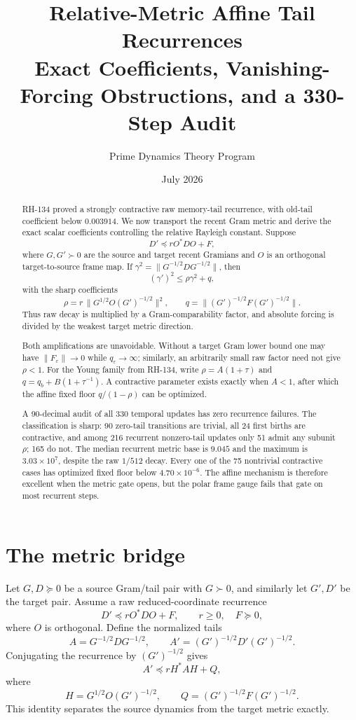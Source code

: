 \documentclass[12pt]{article}
\title{Relative-Metric Affine Tail Recurrences\\\large Exact Coefficients, Vanishing-Forcing Obstructions, and a 330-Step Audit}
\author{Prime Dynamics Theory Program}
\date{July 2026}
\begin{document}
\maketitle

\begin{abstract}
RH-134 proved a strongly contractive raw memory-tail recurrence, with old-tail
coefficient below $0.003914$.  We now transport the recent Gram metric and
derive the exact scalar coefficients controlling the relative Rayleigh
constant.  Suppose
\[
 D'\preceq rO^*DO+F,
\]
where $G,G'\succ0$ are the source and target recent Gramians and $O$ is an
orthogonal target-to-source frame map.  If
$\gamma^2=\|G^{-1/2}DG^{-1/2}\|$, then
\[
 (\gamma')^2\leq\rho\gamma^2+q,
\]
with the sharp coefficients
\[
 \rho=r\,\|G^{1/2}O(G')^{-1/2}\|^2,
 \qquad
 q=\|(G')^{-1/2}F(G')^{-1/2}\|.
\]
Thus raw decay is multiplied by a Gram-comparability factor, and absolute
forcing is divided by the weakest target metric direction.

Both amplifications are unavoidable.  Without a target Gram lower bound one
may have $\|F_\varepsilon\|\to0$ while $q_\varepsilon\to\infty$; similarly,
an arbitrarily small raw factor need not give $\rho<1$.  For the Young family
from RH-134, write
$\rho=A(1+\tau)$ and
$q=q_b+B(1+\tau^{-1})$.  A contractive parameter exists exactly when
$A<1$, after which the affine fixed floor $q/(1-\rho)$ can be optimized.

A 90-decimal audit of all 330 temporal updates has zero recurrence failures.
The classification is sharp: 90 zero-tail transitions are trivial, all 24
first births are contractive, and among 216 recurrent nonzero-tail updates
only 51 admit any subunit $\rho$; 165 do not.  The median recurrent metric
base is $9.045$ and the maximum is $3.03\times10^7$, despite the raw
$1/512$ decay.  Every one of the 75 nontrivial contractive cases has optimized
fixed floor below $4.70\times10^{-6}$.  The affine mechanism is therefore
excellent when the metric gate opens, but the polar frame gauge fails that
gate on most recurrent steps.
\end{abstract}

\section{The metric bridge}
Let $G,D\succeq0$ be a source Gram/tail pair with $G\succ0$, and similarly
let $G',D'$ be the target pair.  Assume a raw reduced-coordinate recurrence
\[
 D'\preceq rO^*DO+F,
 \qquad r\geq0,\quad F\succeq0,
\]
where $O$ is orthogonal.  Define the normalized tails
\[
 A=G^{-1/2}DG^{-1/2},\qquad
 A'=(G')^{-1/2}D'(G')^{-1/2}.
\]
Conjugating the recurrence by $(G')^{-1/2}$ gives
\[
 A'\preceq rH^*AH+Q,
\]
where
\[
 H=G^{1/2}O(G')^{-1/2},\qquad
 Q=(G')^{-1/2}F(G')^{-1/2}.
\]
This identity separates the source dynamics from the target metric exactly.
\end{document}
